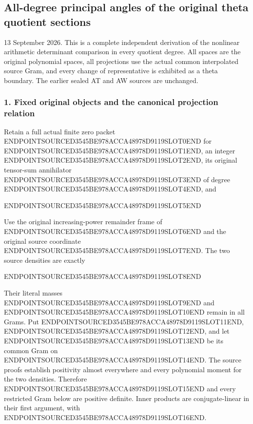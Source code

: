 \subsection{All-degree principal angles of the original theta quotient sections}\label{endpoint-all_degree_angle_review--all-degree-principal-angles-of-the-original-theta-quotient-sections}

13 September 2026. This is a complete independent derivation of the nonlinear arithmetic determinant comparison in every quotient degree. All spaces are the original polynomial spaces, all projections use the actual common interpolated source Gram, and every change of representative is exhibited as a theta boundary. The earlier sealed AT and AW sources are unchanged.

\subsubsection{1. Fixed original objects and the canonical projection relation}\label{endpoint-all_degree_angle_review--fixed-original-objects-and-the-canonical-projection-relation}

Retain a full actual finite zero packet ENDPOINTSOURCED3545BE978ACCA48978D9119SLOT0END for ENDPOINTSOURCED3545BE978ACCA48978D9119SLOT1END, an integer ENDPOINTSOURCED3545BE978ACCA48978D9119SLOT2END, its original tensor-sum annihilator ENDPOINTSOURCED3545BE978ACCA48978D9119SLOT3END of degree ENDPOINTSOURCED3545BE978ACCA48978D9119SLOT4END, and

ENDPOINTSOURCED3545BE978ACCA48978D9119SLOT5END

Use the original increasing-power remainder frame of ENDPOINTSOURCED3545BE978ACCA48978D9119SLOT6END and the original source coordinate ENDPOINTSOURCED3545BE978ACCA48978D9119SLOT7END. The two source densities are exactly

ENDPOINTSOURCED3545BE978ACCA48978D9119SLOT8END

Their literal masses ENDPOINTSOURCED3545BE978ACCA48978D9119SLOT9END and ENDPOINTSOURCED3545BE978ACCA48978D9119SLOT10END remain in all Grams. Put ENDPOINTSOURCED3545BE978ACCA48978D9119SLOT11END, ENDPOINTSOURCED3545BE978ACCA48978D9119SLOT12END, and let ENDPOINTSOURCED3545BE978ACCA48978D9119SLOT13END be its common Gram on ENDPOINTSOURCED3545BE978ACCA48978D9119SLOT14END. The source proofs establish positivity almost everywhere and every polynomial moment for the two densities. Therefore ENDPOINTSOURCED3545BE978ACCA48978D9119SLOT15END and every restricted Gram below are positive definite. Inner products are conjugate-linear in their first argument, with ENDPOINTSOURCED3545BE978ACCA48978D9119SLOT16END.


